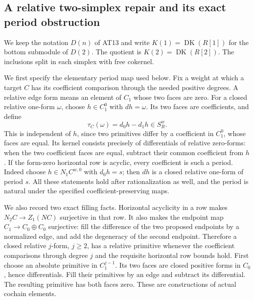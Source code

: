 \subsection{A relative two-simplex repair and its exact period obstruction}

We keep the notation $D(n)$ of AT13 and write
$K(1)=\operatorname{DK}(R[1])$ for the bottom submodule
of $D(2)$. The quotient is $K(2)=\operatorname{DK}(R[2])$.
The inclusions split in each simplex with free cokernel.

We first specify the elementary period map used below.
Fix a weight at which a target $C$ has its coefficient
comparison through the needed positive degrees.
A relative edge form means an element of $C_1$ whose
two faces are zero. For a closed relative one-form $\omega$,
choose $h\in C_1^0$ with $dh=\omega$. Its two faces are
coefficients, and define
\[
             \tau_C(\omega)=d_0h-d_1h\in S_R^w.
 \tag{AT.61}
\]
This is independent of $h$, since two primitives
differ by a coefficient in $C_1^0$, whose faces are equal.
Its kernel consists precisely of differentials of
relative zero-forms: when the two coefficient faces
are equal, subtract their common coefficient from $h$.
If the form-zero horizontal row is acyclic, every
coefficient is such a period. Indeed choose
$h\in N_1C^{w,0}$ with $d_0h=s$; then $dh$ is a
closed relative one-form of period $s$.
All these statements hold after rationalization as well,
and the period is natural under the specified
coefficient-preserving maps.

We also record two exact filling facts. Horizontal
acyclicity in a row makes $N_2C\to Z_1(NC)$ surjective
in that row. It also makes the endpoint map
$C_1\to C_0\oplus C_0$ surjective: fill the difference
of the two proposed endpoints by a normalized edge,
and add the degeneracy of the second endpoint.
Therefore a closed relative $j$-form, $j\geq2$, has a
relative primitive whenever the coefficient comparisons
through degree $j$ and the requisite horizontal row
bounds hold. First choose an absolute primitive in
$C_1^{j-1}$. Its two faces are closed positive forms
in $C_0$, hence differentials. Fill their primitives
by an edge and subtract its differential.
The resulting primitive has both faces zero.
These are constructions of actual cochain elements.

